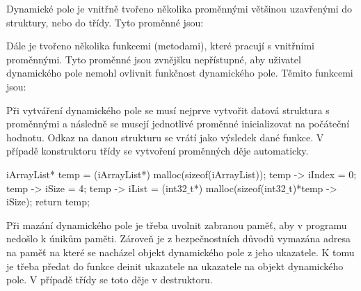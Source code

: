 
Dynamické pole je vnitřně tvořeno několika proměnnými většinou uzavřenými do struktury, nebo do třídy. Tyto proměnné jsou:

Dále je tvořeno několika funkcemi (metodami), které pracují s vnitřními proměnnými. Tyto proměnné jsou zvnějšku nepřístupné, aby uživatel dynamického pole nemohl ovlivnit funkčnost dynamického pole. Těmito funkcemi jsou:




Při vytváření dynamického pole se musí nejprve vytvořit datová struktura s proměnnými a následně se musejí jednotlivé proměnné inicializovat na počáteční hodnotu. Odkaz na danou strukturu se vrátí jako výsledek dané funkce. V případě konstruktoru třídy se vytvoření proměnných děje automaticky. 

\vskip 4mm
{
\verbatim
\odradkovat
iArrayList* temp = (iArrayList*) malloc(sizeof(iArrayList));\odradkovat
temp -> iIndex = 0;\odradkovat
temp -> iSize = 4;\odradkovat
temp -> iList = (int32$\_$t*) malloc(sizeof(int32$\_$t)*temp -> iSize);\odradkovat
return temp;
}
\vskip 4mm

Při mazání dynamického pole je třeba uvolnit zabranou paměť, aby v programu nedošlo k únikům paměti. Zároveň je z bezpečnostních důvodů vymazána adresa na paměť na které se nacházel objekt dynamického pole z jeho ukazatele. K tomu je třeba předat do funkce deinit ukazatele na ukazatele na objekt dynamického pole. V případě třídy se toto děje v destruktoru.

